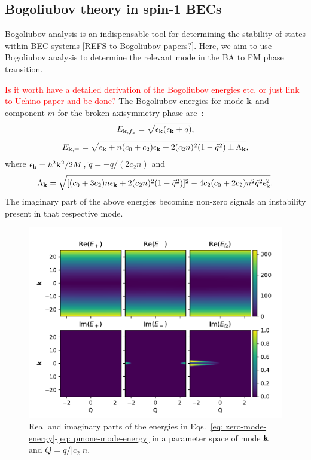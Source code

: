 \subsection{Bogoliubov theory in spin-1 BECs}
Bogoliubov analysis is an indispensable tool for determining the stability of
states within BEC systems [REFS to Bogoliubov papers?].
Here, we aim to use Bogoliubov analysis to determine the relevant mode in the
BA to FM phase transition.

\textcolor{red}{Is it worth have a detailed derivation of the
Bogoliubov energies etc. or just link to Uchino paper and be done?}
The Bogoliubov energies for mode $\vb{k}$ and component $m$ for the
broken-axisymmetry phase are~\cite{Uchino2010}:
\begin{equation}
    E_{\vb{k}, {f_z}} = \sqrt{\epsilon_{\vb{k}}(\epsilon_{\vb{k}} + q)},
    \label{eq: zero-mode-energy}
\end{equation}
\begin{equation}
    E_{\vb{k}, \pm} = \sqrt{\epsilon_{\vb{k}} + n(c_0 + c_2)\epsilon_{\vb{k}} 
    + 2(c_2n)^2(1 - \tilde{q}^2) \pm \Lambda_{\vb{k}}},
    \label{eq: pmone-mode-energy}
\end{equation}
where $\epsilon_{\vb{k}} = \hbar^2\vb{k}^2 / 2M$, $\tilde{q} = -q/(2c_2n)$ and
\begin{equation}
    \Lambda_{\vb{k}} = \sqrt{[(c_0+3c_2)n\epsilon_{\vb{k}} 
    + 2(c_2n)^2(1-\tilde{q}^2)]^2 
    - 4c_2(c_0+2c_2)n^2\tilde{q}^2\epsilon_{\vb{k}}^2}.
\end{equation}
The imaginary part of the above energies becoming non-zero signals an
instability present in that respective mode.
\begin{figure}[tb]
    \centering
    \includegraphics[width=\textwidth]{gfx/ch-spin1/dens_spin_energies.pdf}
    \caption{Real and imaginary parts of the energies in
    Eqs.~\eqref{eq: zero-mode-energy}-\eqref{eq: pmone-mode-energy} in a
    parameter space of mode $\vb{k}$ and $Q=q/|c_2|n$.}
    \label{fig: dens-spin-energies}
\end{figure}
